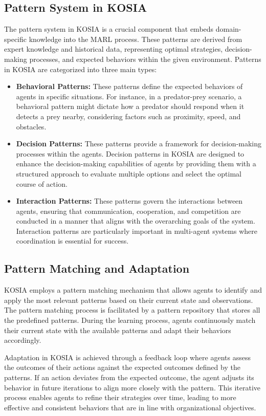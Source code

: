 \documentclass[sn-mathphys-num]{sn-jnl}%
\theoremstyle{thmstyleone}%
\theoremstyle{thmstyletwo}%
\theoremstyle{thmstylethree}%
\begin{document}
\subsection{Pattern System in KOSIA}
The pattern system in KOSIA is a crucial component that embeds domain-specific knowledge into the MARL process. These patterns are derived from expert knowledge and historical data, representing optimal strategies, decision-making processes, and expected behaviors within the given environment. Patterns in KOSIA are categorized into three main types:

\begin{itemize}
    \item \textbf{Behavioral Patterns:} These patterns define the expected behaviors of agents in specific situations. For instance, in a predator-prey scenario, a behavioral pattern might dictate how a predator should respond when it detects a prey nearby, considering factors such as proximity, speed, and obstacles.

    \item \textbf{Decision Patterns:} These patterns provide a framework for decision-making processes within the agents. Decision patterns in KOSIA are designed to enhance the decision-making capabilities of agents by providing them with a structured approach to evaluate multiple options and select the optimal course of action.

    \item \textbf{Interaction Patterns:} These patterns govern the interactions between agents, ensuring that communication, cooperation, and competition are conducted in a manner that aligns with the overarching goals of the system. Interaction patterns are particularly important in multi-agent systems where coordination is essential for success.
\end{itemize}

\subsection{Pattern Matching and Adaptation}
KOSIA employs a pattern matching mechanism that allows agents to identify and apply the most relevant patterns based on their current state and observations. The pattern matching process is facilitated by a pattern repository that stores all the predefined patterns. During the learning process, agents continuously match their current state with the available patterns and adapt their behaviors accordingly.

Adaptation in KOSIA is achieved through a feedback loop where agents assess the outcomes of their actions against the expected outcomes defined by the patterns. If an action deviates from the expected outcome, the agent adjusts its behavior in future iterations to align more closely with the pattern. This iterative process enables agents to refine their strategies over time, leading to more effective and consistent behaviors that are in line with organizational objectives.
\end{document}
